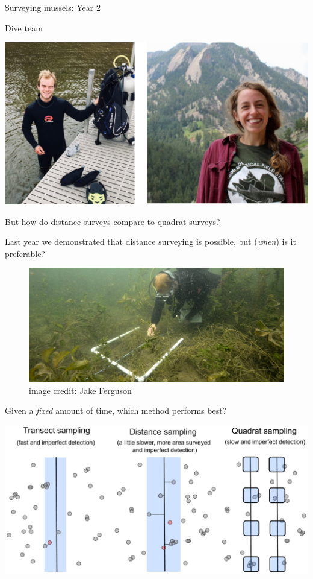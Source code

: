 \documentclass[ignorenonframetext,]{beamer}
\begin{document}
\begin{frame}{Surveying mussels: Year 2}
\protect\hypertarget{surveying-mussels-year-2}{}

\begin{block}{Dive team}

\includegraphics[width=0.9\linewidth]{../Figures/Season2Group}

\end{block}

\begin{block}{But how do distance surveys compare to quadrat surveys?}

Last year we demonstrated that distance surveying is possible, but
(\emph{when}) is it preferable?\\

\begin{figure}

{\centering \includegraphics[width=0.6\linewidth]{../Figures/AustenQuad} 

}

\caption{image credit: Jake Ferguson}\label{fig:unnamed-chunk-12}
\end{figure}

\end{block}

\begin{block}{Given a \emph{fixed} amount of time, which method performs
best?}

\begin{center}\includegraphics[width=0.6\linewidth]{../Figures/DistanceQuadratSampling} \end{center}


\end{block}
\end{frame}
\end{document}
